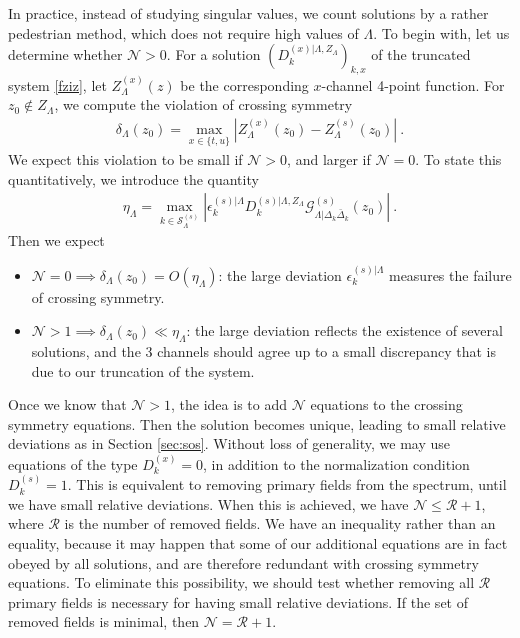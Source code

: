 \documentclass[12pt, a4paper]{article}
\begin{document}
In practice, instead of studying singular values, we count solutions by a rather pedestrian method, which does not require high values of $\Lambda$. To begin with, let us determine whether $\mathcal{N}>0$. For a solution $\left(D_k^{(x)|\Lambda,Z_\Lambda}\right)_{k,x}$ of the truncated system \eqref{fziz}, let $Z^{(x)}_\Lambda(z)$ be the corresponding $x$-channel 4-point function. For $z_0\notin Z_\Lambda$, we compute the violation of crossing symmetry 
\begin{align}
 \delta_\Lambda(z_0) = \max_{x\in\{t,u\}} \left|Z^{(x)}_\Lambda(z_0)-Z^{(s)}_\Lambda(z_0)\right|\ . 
\end{align}
We expect this violation to be small if $\mathcal{N}>0$, and larger if $\mathcal{N}=0$. To state this  quantitatively, we introduce the quantity 
\begin{align}
 \eta_\Lambda = \max_{k\in \mathcal{S}_\Lambda^{(s)}} \left|\epsilon_k^{(s)|\Lambda} D_k^{(s)|\Lambda,Z_\Lambda}\mathcal{G}^{(s)}_{\Lambda|\Delta_k\bar\Delta_k}(z_0)\right| \ .
\end{align}
Then we expect
\begin{itemize}
 \item $\mathcal{N}=0\implies \delta_\Lambda(z_0) = O(\eta_\Lambda)$: the large deviation $\epsilon_k^{(s)|\Lambda}$ measures the failure of crossing symmetry.
 \item $\mathcal{N}>1\implies \delta_\Lambda(z_0) \ll \eta_\Lambda$: the large deviation reflects the existence of several solutions, and the 3 channels should agree up to a small discrepancy that is due to our truncation of the system. 
\end{itemize}
Once we know that $\mathcal{N}>1$, the idea is to add $\mathcal{N}$ equations to the crossing symmetry equations. Then the solution becomes unique, leading to small relative deviations as in Section \ref{sec:sos}. Without loss of generality, we may use equations of the type $D^{(x)}_k=0$, in addition to the normalization condition $D^{(s)}_k=1$. This is equivalent to removing primary fields from the spectrum, until we have small relative deviations. When this is achieved, we have $\mathcal{N}\leq \mathcal{R}+1$, where $\mathcal{R}$ is the number of removed fields. We have an inequality rather than an equality, because it may happen that some of our additional equations are in fact obeyed by all solutions, and are therefore redundant with crossing symmetry equations. To eliminate this possibility, we should test whether removing all $\mathcal{R}$ primary fields is necessary for having small relative deviations. If the set of removed fields is minimal, then $\mathcal{N}= \mathcal{R}+1$.
\end{document}
